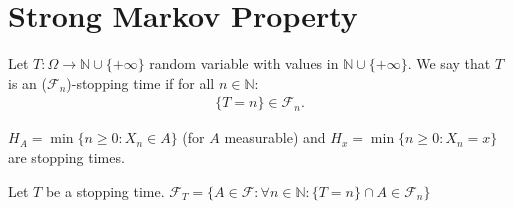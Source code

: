 \section{Strong Markov Property}
	
\begin{defn}
	Let $T:\Omega \to \mathbb{N} \cup \{+\infty\}$ random variable with values in $\mathbb{N}\cup\{+\infty\}$. We say that $T$ is an ($ \mathcal{F}_n$)-stopping time if for all $n \in \mathbb{N}$:
	\begin{align}
		\{T=n\} \in \mathcal{F}_n
	.\end{align}
\end{defn}

\begin{ex}
	$H_{A}=\min\{n \geq 0: X_n \in  A\}$ (for $A$ measurable) and $H_x=\min\{n\geq 0: X_n = x\}$ are stopping times.
\end{ex}

\begin{defn}
	Let $T$ be a stopping time. $ \mathcal{F}_T=\{A \in \mathcal{F}: \forall n \in \mathbb{N}: \{T=n\}\cap A \in \mathcal{F}_n \}$
\end{defn}

